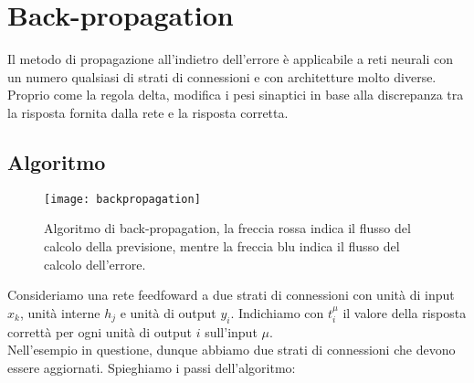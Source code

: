 \section{Back-propagation}

Il metodo di propagazione all'indietro dell'errore è applicabile a reti neurali
con un numero qualsiasi di strati di connessioni e con architetture molto
diverse. Proprio come la regola delta, modifica i pesi sinaptici in base alla
discrepanza tra la risposta fornita dalla rete e la risposta corretta.

\subsection{Algoritmo}

\begin{figure}[H]
	\centering
	\texttt{[image: backpropagation]}
	\caption{Algoritmo di back-propagation, la freccia rossa indica il flusso
		del calcolo della previsione, mentre la freccia blu indica il flusso del
		calcolo dell'errore.}
	\label{fig:backpropagation}
\end{figure}

Consideriamo una rete feedfoward a due strati di connessioni con unità di input
$x_k$, unità interne $h_j$ e unità di output $y_i$. Indichiamo con $t^\mu_i$ il
valore della risposta correttà per ogni unità di output $i$ sull'input $\mu$.\\
Nell'esempio in questione, dunque abbiamo due strati di connessioni che devono
essere aggiornati. Spieghiamo i passi dell'algoritmo:

